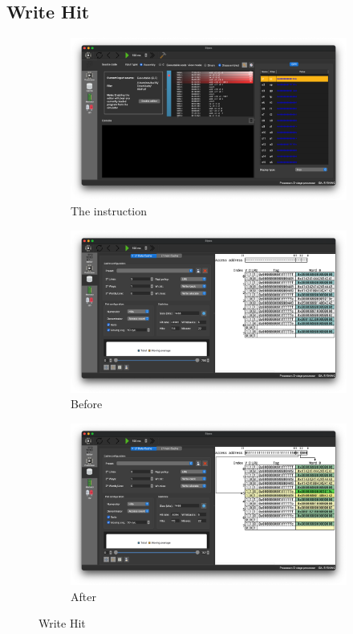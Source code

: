 \documentclass[12pt, a4paper]{article}
\begin{document}
\subsection{Write Hit}

\begin{figure}[htbp]
\begin{subfigure}{\linewidth}
\centering
\includegraphics[width=.69\linewidth]{b}
\caption{The instruction}
\end{subfigure}
\begin{subfigure}{\linewidth}
\centering
\includegraphics[width=.807\linewidth]{b0}
\caption{Before}
\label{fig:1b0}
\end{subfigure}
\begin{subfigure}{\linewidth}
\centering
\includegraphics[width=.807\linewidth]{b1}
\caption{After}
\label{fig:1b1}
\end{subfigure}
\caption{Write Hit}
\label{fig:1b}
\end{figure}
\end{document}

